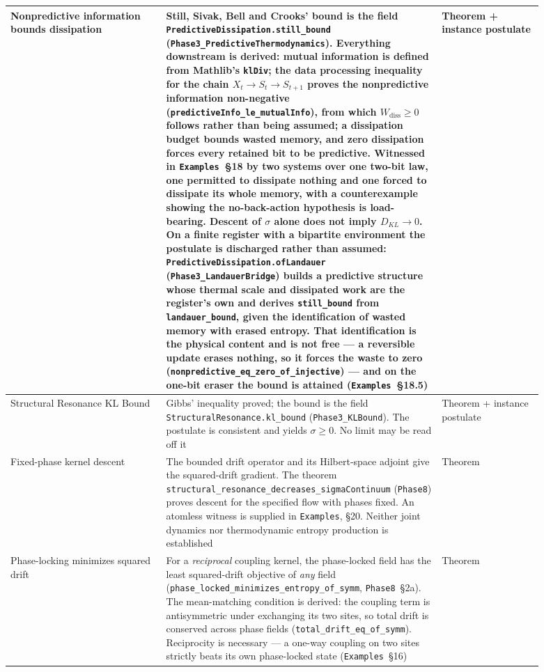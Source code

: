 \documentclass{article}
\begin{document}
\begin{longtable}{|>{\raggedright\arraybackslash}p{0.26\linewidth}|>{\raggedright\arraybackslash}p{0.46\linewidth}|>{\raggedright\arraybackslash}p{0.17\linewidth}|}
Nonpredictive information bounds dissipation & Still, Sivak, Bell and Crooks' bound is the field \nolinkurl{PredictiveDissipation.still_bound} (\nolinkurl{Phase3_PredictiveThermodynamics}). Everything downstream is derived: mutual information is defined from Mathlib's \texttt{klDiv}; the data processing inequality for the chain $X_t \to S_t \to S_{t+1}$ proves the nonpredictive information non-negative (\nolinkurl{predictiveInfo_le_mutualInfo}), from which $W_{\mathrm{diss}} \ge 0$ follows rather than being assumed; a dissipation budget bounds wasted memory, and zero dissipation forces every retained bit to be predictive. Witnessed in \texttt{Examples}~\S18 by two systems over one two-bit law, one permitted to dissipate nothing and one forced to dissipate its whole memory, with a counterexample showing the no-back-action hypothesis is load-bearing. Descent of $\sigma$ alone does not imply $D_{KL}\to0$. On a finite register with a bipartite environment the postulate is discharged rather than assumed: \nolinkurl{PredictiveDissipation.ofLandauer} (\nolinkurl{Phase3_LandauerBridge}) builds a predictive structure whose thermal scale and dissipated work are the register's own and derives \nolinkurl{still_bound} from \nolinkurl{landauer_bound}, given the identification of wasted memory with erased entropy. That identification is the physical content and is not free --- a reversible update erases nothing, so it forces the waste to zero (\nolinkurl{nonpredictive_eq_zero_of_injective}) --- and on the one-bit eraser the bound is attained (\texttt{Examples}~\S18.5) & Theorem + instance postulate \\ \hline
Structural Resonance KL Bound & Gibbs' inequality proved; the bound is the field \nolinkurl{StructuralResonance.kl_bound} (\nolinkurl{Phase3_KLBound}). The postulate is consistent and yields $\sigma \ge 0$. No limit may be read off it & Theorem + instance postulate \\ \hline
Fixed-phase kernel descent & The bounded drift operator and its Hilbert-space adjoint give the squared-drift gradient. The theorem \nolinkurl{structural_resonance_decreases_sigmaContinuum} (\texttt{Phase8}) proves descent for the specified flow with phases fixed. An atomless witness is supplied in \texttt{Examples}, \S20. Neither joint dynamics nor thermodynamic entropy production is established & Theorem \\ \hline
Phase-locking minimizes squared drift & For a \emph{reciprocal} coupling kernel, the phase-locked field has the least squared-drift objective of \emph{any} field (\nolinkurl{phase_locked_minimizes_entropy_of_symm}, \texttt{Phase8}~\S2a). The mean-matching condition is derived: the coupling term is antisymmetric under exchanging its two sites, so total drift is conserved across phase fields (\nolinkurl{total_drift_eq_of_symm}). Reciprocity is necessary --- a one-way coupling on two sites strictly beats its own phase-locked state (\texttt{Examples}~\S16) & Theorem \\ \hline

\end{longtable}
\end{document}
